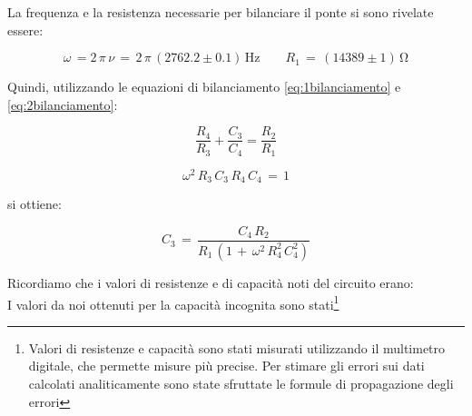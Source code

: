 La frequenza e la resistenza necessarie per bilanciare il ponte si sono rivelate essere:

\begin{equation*}
\omega \, = 2 \, \pi \, \nu \, = \, 2 \, \pi \, (2762.2 \pm 0.1) \, \si{\hertz}
\qquad R_1 \, = \, (14389 \pm 1) \, \si{\ohm}
\end{equation*}


\noindent Quindi, utilizzando le equazioni di bilanciamento \ref{eq:1bilanciamento} e \ref{eq:2bilanciamento}:\\

\noindent
\begin{minipage}{.5\linewidth}

\begin{equation}
\frac{R_4}{R_3} + \frac{C_3}{C_4} = \frac{R_2}{R_1}
\label{eq:1bilanciamento}
\end{equation}

\end{minipage}%
\begin{minipage}{.5\linewidth}

\begin{equation}
\omega^2 \, R_3 \, C_3 \, R_4 \, C_4 \, = \, 1
\label{eq:2bilanciamento}
\end{equation}

\end{minipage}

si ottiene:

\begin{equation}
C_3 \, = \, \frac{C_4 \, R_2}{R_1 \, (1 \, + \, \omega^2 \, R_4^2 \, C_4^2)}
\label{eq:C3}
\end{equation}

Ricordiamo che i valori di resistenze e di capacità noti del circuito erano:\\
I valori da noi ottenuti per la capacità incognita sono stati\footnote{Valori di resistenze e capacità sono stati misurati utilizzando il multimetro digitale, che permette misure più precise. Per stimare gli errori sui dati calcolati analiticamente sono state sfruttate le formule di propagazione degli errori}\\

